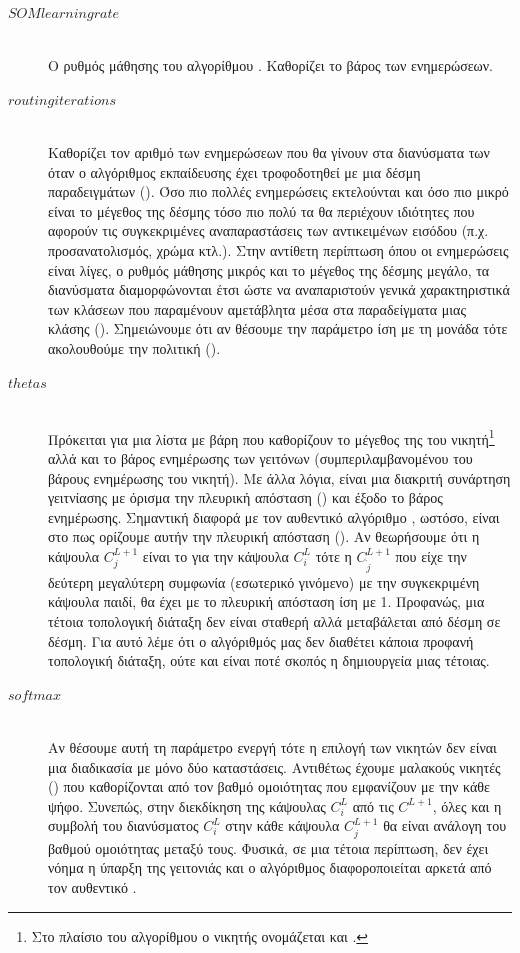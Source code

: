 \begin{description}
  \item[$SOM learning rate$] \hfill \\ Ο ρυθμός μάθησης του αλγορίθμου . Καθορίζει το βάρος των ενημερώσεων.
  \item[$routing iterations$] \hfill \\ Καθορίζει τον αριθμό των ενημερώσεων που θα γίνουν στα διανύσματα των  όταν ο αλγόριθμος εκπαίδευσης έχει τροφοδοτηθεί με μια δέσμη παραδειγμάτων (). Όσο πιο πολλές ενημερώσεις εκτελούνται και όσο πιο μικρό είναι το μέγεθος της δέσμης τόσο πιο πολύ τα  θα περιέχουν ιδιότητες που αφορούν τις συγκεκριμένες αναπαραστάσεις των αντικειμένων εισόδου (π.χ. προσανατολισμός, χρώμα κτλ.). Στην αντίθετη περίπτωση όπου οι ενημερώσεις είναι λίγες, ο ρυθμός μάθησης  μικρός και το μέγεθος της δέσμης μεγάλο, τα διανύσματα  διαμορφώνονται έτσι ώστε να αναπαριστούν γενικά χαρακτηριστικά των κλάσεων που παραμένουν αμετάβλητα μέσα στα παραδείγματα μιας κλάσης (). Σημειώνουμε ότι αν θέσουμε την παράμετρο ίση με τη μονάδα τότε ακολουθούμε την πολιτική  ().
  \item[$thetas$] \hfill \\ Πρόκειται για μια λίστα με βάρη που καθορίζουν το μέγεθος της  του νικητή\footnote{Στο πλαίσιο του αλγορίθμου  ο νικητής ονομάζεται και .} αλλά και το βάρος ενημέρωσης των γειτόνων (συμπεριλαμβανομένου του βάρους ενημέρωσης του νικητή). Με άλλα λόγια, είναι μια διακριτή συνάρτηση γειτνίασης με όρισμα την πλευρική απόσταση () και έξοδο το βάρος ενημέρωσης. Σημαντική διαφορά με τον αυθεντικό αλγόριθμο , ωστόσο, είναι στο πως ορίζουμε αυτήν την πλευρική απόσταση (). Αν θεωρήσουμε ότι η κάψουλα $C_j^{L+1}$ είναι το  για την κάψουλα $C_i^L$ τότε η $C^{L+1}_{\grave{j}}$ που είχε την δεύτερη μεγαλύτερη συμφωνία (εσωτερικό γινόμενο) με την συγκεκριμένη κάψουλα παιδί, θα έχει με το  πλευρική απόσταση ίση με 1. Προφανώς, μια τέτοια τοπολογική διάταξη δεν είναι σταθερή αλλά μεταβάλεται από δέσμη σε δέσμη. Για αυτό λέμε ότι ο αλγόριθμός μας δεν διαθέτει κάποια προφανή τοπολογική διάταξη, ούτε και είναι ποτέ σκοπός η δημιουργεία μιας τέτοιας.
  \item[$softmax$] \hfill \\ Αν θέσουμε αυτή τη παράμετρο ενεργή τότε η επιλογή των νικητών δεν είναι μια διαδικασία με μόνο δύο καταστάσεις. Αντιθέτως έχουμε μαλακούς νικητές () που καθορίζονται από τον βαθμό ομοιότητας που εμφανίζουν με την κάθε ψήφο. Συνεπώς, στην διεκδίκηση της κάψουλας $C_i^L$ από τις $C^{L+1}$, όλες  και η συμβολή του διανύσματος  $C_i^L$ στην κάθε κάψουλα $C^{L+1}_j$ θα είναι ανάλογη του βαθμού ομοιότητας μεταξύ τους. Φυσικά, σε μια τέτοια περίπτωση, δεν έχει νόημα η ύπαρξη της γειτονιάς και ο αλγόριθμος διαφοροποιείται αρκετά από τον αυθεντικό .

\end{description}
